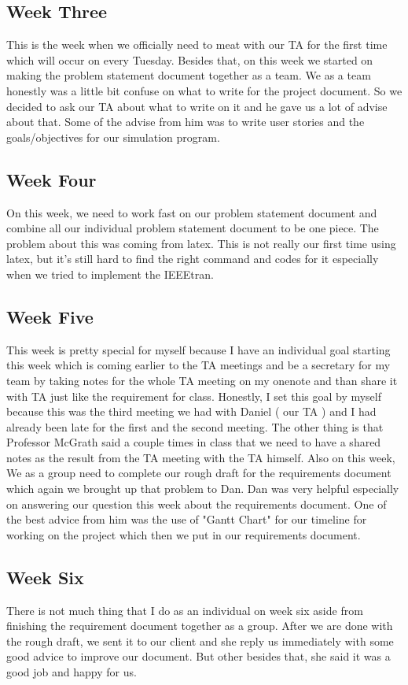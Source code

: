 \begin{singlespace}
\subsection{Week Three}
This is the week when we officially need to meat with our TA for the first time which will occur on every Tuesday. Besides that, on this week we started on making the problem statement document together as a team. We as a team honestly was a little bit confuse on what to write for the project document. So we decided to ask our TA about what to write on it and he gave us a lot of advise about that. Some of the advise from him was to write user stories and the goals/objectives for our simulation program. 

\subsection{Week Four}
On this week, we need to work fast on our problem statement document and combine all our individual problem statement document to be one piece. The problem about this was coming from latex. This is not really our first time using latex, but it's still hard to find the right command and codes for it especially when we tried to implement the IEEEtran. 

\subsection{Week Five}
This week is pretty special for myself because I have an individual goal starting this week which is coming earlier to the TA meetings and be a secretary for my team by taking notes for the whole TA meeting on my onenote and than share it with TA just like the requirement for class. Honestly, I set this goal by myself because this was the third meeting we had with Daniel ( our TA ) and I had already been late for the first and the second meeting. The other thing is that Professor McGrath said a couple times in class that we need to have a shared notes as the result from the TA meeting with the TA himself. Also on this week, We as a group need to complete our rough draft for the requirements document which again we brought up that problem to Dan. Dan was very helpful especially on answering our question this week about the requirements document. One of the best advice from him was the use of "Gantt Chart" for our timeline for working on the project which then we put in our requirements document. 

\subsection{Week Six}
There is not much thing that I do as an individual on week six aside from finishing the requirement document together as a group. After we are done with the rough draft, we sent it to our client and she reply us immediately with some good advice to improve our document. But other besides that, she said it was a good job and happy for us. 


\end{singlespace}
